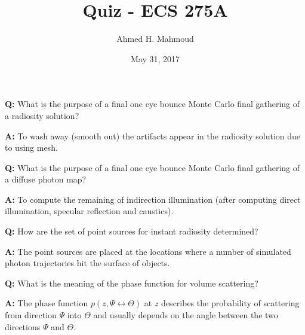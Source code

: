 \documentclass[12pt] {article}
\begin{document}
\title{Quiz - ECS 275A}
\author{Ahmed H. Mahmoud}
\date{May 31, 2017} 

\maketitle

\textbf{Q:} What is the purpose of a final one eye bounce Monte Carlo final gathering of a radiosity solution?

\textbf{A:} To wash away (smooth out) the artifacts appear in the radiosity solution due to using mesh. 
\newline


\textbf{Q:} What is the purpose of a final one eye bounce Monte Carlo final gathering of a diffuse photon map?

\textbf{A:}
To compute the remaining of indirection illumination (after computing direct illumination, specular reflection and caustics).
\newline

\textbf{Q:} How are the set of point sources for instant radiosity determined?

\textbf{A:} The point sources are placed at the locations where a number of simulated photon trajectories hit the surface of objects. 
\newline

\textbf{Q:} What is the meaning of the phase function for volume scattering?

\textbf{A:} The phase function $p(z,\Psi \leftrightarrow \Theta)$ at $z$ describes the probability of scattering from direction $\Psi$ into $\Theta$ and usually depends on the angle between the two directions $\Psi$ and $\Theta$.
\end{document}
